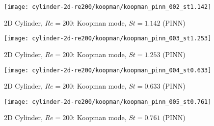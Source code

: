 \begin{figure}[hbt!]
    \centering
    \texttt{[image: cylinder-2d-re200/koopman/koopman\_pinn\_002\_st1.142]}
    \caption{2D Cylinder, $Re=200$: Koopman mode, $St=1.142$ (PINN)}
    \label{fig:koopman-pinn-damped-mode-1}
\end{figure}

\begin{figure}[hbt!]
    \centering
    \texttt{[image: cylinder-2d-re200/koopman/koopman\_pinn\_003\_st1.253]}
    \caption{2D Cylinder, $Re=200$: Koopman mode, $St=1.253$ (PINN)}
    \label{fig:koopman-pinn-damped-mode-2}
\end{figure}

\begin{figure}[hbt!]
    \centering
    \texttt{[image: cylinder-2d-re200/koopman/koopman\_pinn\_004\_st0.633]}
    \caption{2D Cylinder, $Re=200$: Koopman mode, $St=0.633$ (PINN)}
    \label{fig:koopman-pinn-damped-mode-3}
\end{figure}

\begin{figure}[hbt!]
    \centering
    \texttt{[image: cylinder-2d-re200/koopman/koopman\_pinn\_005\_st0.761]}
    \caption{2D Cylinder, $Re=200$: Koopman mode, $St=0.761$ (PINN)}
    \label{fig:koopman-pinn-damped-mode-4}
\end{figure}

